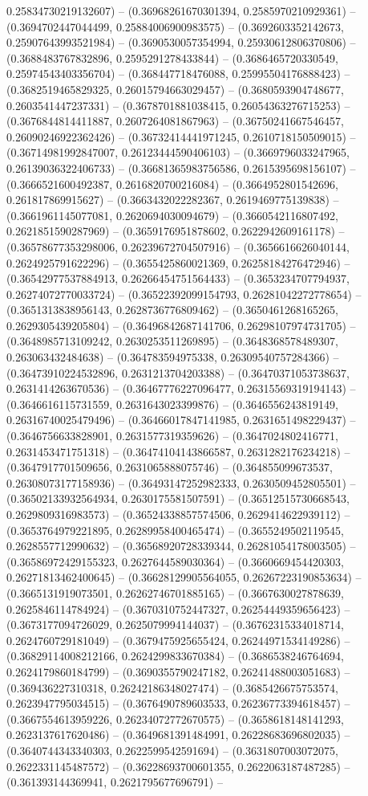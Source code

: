 0.25834730219132607) -- (0.36968261670301394, 0.2585970210929361) -- (0.3694702447044499, 0.25884006900983575) -- (0.3692603352142673, 0.25907643993521984) -- (0.3690530057354994, 0.25930612806370806) -- (0.3688483767832896, 0.2595291278433844) -- (0.3686465720330549, 0.25974543403356704) -- (0.368447718476088, 0.25995504176888423) -- (0.3682519465829325, 0.26015794663029457) -- (0.3680593904748677, 0.2603541447237331) -- (0.3678701881038415, 0.26054363276715253) -- (0.3676844814411887, 0.2607264081867963) -- (0.36750241667546457, 0.26090246922362426) -- (0.36732414441971245, 0.2610718150509015) -- (0.36714981992847007, 0.26123444590406103) -- (0.3669796033247965, 0.26139036322406733) -- (0.36681365983756586, 0.2615395698156107) -- (0.3666521600492387, 0.2616820700216084) -- (0.3664952801542696, 0.261817869915627) -- (0.3663432022282367, 0.2619469775139838) -- (0.3661961145077081, 0.2620694030094679) -- (0.3660542116807492, 0.2621851590287969) -- (0.3659176951878602, 0.2622942609161178) -- (0.36578677353298006, 0.26239672704507916) -- (0.3656616626040144, 0.2624925791622296) -- (0.3655425860021369, 0.26258184276472946) -- (0.36542977537884913, 0.26266454751564433) -- (0.3653234707794937, 0.26274072770033724) -- (0.36522392099154793, 0.26281042272778654) -- (0.3651313838956143, 0.2628736776809462) -- (0.3650461268165265, 0.2629305439205804) -- (0.36496842687141706, 0.26298107974731705) -- (0.3648985713109242, 0.2630253511269895) -- (0.3648368578489307, 0.263063432484638) -- (0.364783594975338, 0.26309540757284366) -- (0.36473910224532896, 0.2631213704203388) -- (0.36470371053738637, 0.2631414263670536) -- (0.36467776227096477, 0.26315569319194143) -- (0.3646616115731559, 0.2631643023399876) -- (0.3646556243819149, 0.26316740025479496) -- (0.36466017847141985, 0.2631651498229437) -- (0.3646756633828901, 0.2631577319359626) -- (0.3647024802416771, 0.2631453471751318) -- (0.36474104143866587, 0.2631282176234218) -- (0.3647917701509656, 0.2631065888075746) -- (0.364855099673537, 0.26308073177158936) -- (0.36493147252982333, 0.2630509452805501) -- (0.36502133932564934, 0.2630175581507591) -- (0.36512515730668543, 0.2629809316983573) -- (0.36524338857574506, 0.2629414622939112) -- (0.3653764979221895, 0.26289958400465474) -- (0.3655249502119545, 0.2628557712990632) -- (0.36568920728339344, 0.26281054178003505) -- (0.36586972429155323, 0.2627644589030364) -- (0.3660669454420303, 0.26271813462400645) -- (0.36628129905564055, 0.26267223190853634) -- (0.3665131919073501, 0.26262746701885165) -- (0.3667630027878639, 0.2625846114784924) -- (0.3670310752447327, 0.26254449359656423) -- (0.3673177094726029, 0.2625079994144037) -- (0.36762315334018714, 0.2624760729181049) -- (0.3679475925655424, 0.26244971534149286) -- (0.36829114008212166, 0.2624299833670384) -- (0.3686538246764694, 0.2624179860184799) -- (0.3690355790247182, 0.26241488003051683) -- (0.369436227310318, 0.26242186348027474) -- (0.3685426675753574, 0.2623947795034515) -- (0.3676490789603533, 0.26236773394618457) -- (0.3667554613959226, 0.26234072772670575) -- (0.3658618148141293, 0.2623137617620486) -- (0.3649681391484991, 0.26228683696802035) -- (0.3640744343340303, 0.2622599542591694) -- (0.3631807003072075, 0.2622331145487572) -- (0.36228693700601355, 0.2622063187487285) -- (0.361393144369941, 0.2621795677696791) -- 